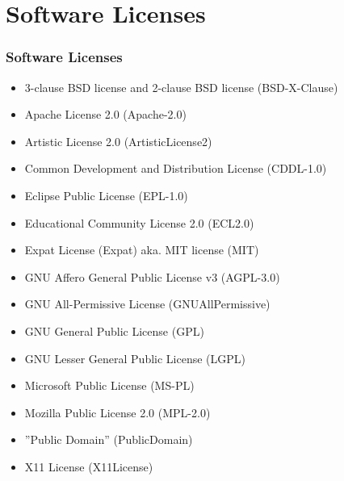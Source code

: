\documentclass[aspectratio=169, xcolor=table, notheorems, hyperref={pdfpagelabels=false}]{beamer}
\begin{document}
\section{Software Licenses}
\begin{frame}
\frametitle{Software Licenses}
\begin{itemize}
\item 3-clause BSD license and 2-clause BSD license (BSD-X-Clause) 
\item Apache License 2.0 (Apache-2.0)
\item Artistic License 2.0 (ArtisticLicense2)
\item Common Development and Distribution License (CDDL-1.0)
\item Eclipse Public License (EPL-1.0)
\item Educational Community License 2.0 (ECL2.0)
\item Expat License (Expat) aka.  MIT license (MIT) 
\item GNU Affero General Public License v3 (AGPL-3.0)
\item GNU All-Permissive License (GNUAllPermissive)
\item GNU General Public License (GPL)
\item GNU Lesser General Public License (LGPL)
\item Microsoft Public License (MS-PL)
\item Mozilla Public License 2.0 (MPL-2.0)
\item ''Public Domain'' (PublicDomain)
\item X11 License (X11License)
\end{itemize}
\end{frame}

\end{document}
